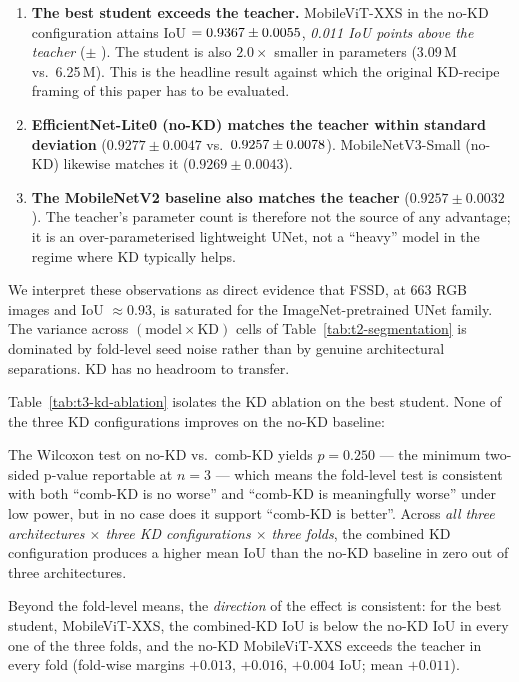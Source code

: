 \begin{enumerate}
\item \textbf{The best student exceeds the teacher.} MobileViT-XXS in the no-KD configuration attains IoU $= 0.9367 \pm 0.0055$, \emph{0.011 IoU points above the teacher} (\teacherIoU $\pm$ \teacherStd). The student is also $2.0\times$ smaller in parameters (3.09\,M vs.~6.25\,M). This is the headline result against which the original KD-recipe framing of this paper has to be evaluated.
\item \textbf{EfficientNet-Lite0 (no-KD) matches the teacher within standard deviation} ($0.9277 \pm 0.0047$ vs.~$0.9257 \pm 0.0078$). MobileNetV3-Small (no-KD) likewise matches it ($0.9269 \pm 0.0043$).
\item \textbf{The MobileNetV2 baseline also matches the teacher} ($0.9257 \pm 0.0032$). The teacher's parameter count is therefore not the source of any advantage; it is an over-parameterised lightweight UNet, not a ``heavy'' model in the regime where KD typically helps.
\end{enumerate}

We interpret these observations as direct evidence that FSSD, at 663 RGB images and IoU $\approx 0.93$, is saturated for the ImageNet-pretrained UNet family. The variance across $(\text{model} \times \text{KD})$ cells of Table~\ref{tab:t2-segmentation} is dominated by fold-level seed noise rather than by genuine architectural separations. KD has no headroom to transfer.

Table~\ref{tab:t3-kd-ablation} isolates the KD ablation on the best student. None of the three KD configurations improves on the no-KD baseline:



The Wilcoxon test on no-KD vs.~comb-KD yields $p = 0.250$ --- the minimum two-sided p-value reportable at $n=3$ --- which means the fold-level test is consistent with both ``comb-KD is no worse'' and ``comb-KD is meaningfully worse'' under low power, but in no case does it support ``comb-KD is better''. Across \emph{all three architectures $\times$ three KD configurations $\times$ three folds}, the combined KD configuration produces a higher mean IoU than the no-KD baseline in zero out of three architectures.

Beyond the fold-level means, the \emph{direction} of the effect is consistent: for the best student, MobileViT-XXS, the combined-KD IoU is below the no-KD IoU in every one of the three folds, and the no-KD MobileViT-XXS exceeds the teacher in every fold (fold-wise margins $+0.013$, $+0.016$, $+0.004$ IoU; mean $+0.011$).

